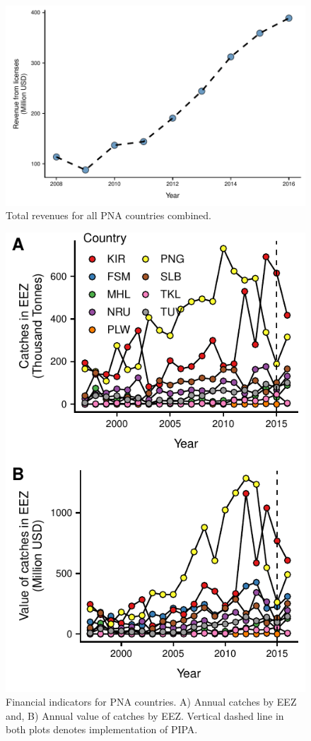 \documentclass[9p,twocolumn,twoside,lineno]{pnas-new}
\begin{document}
\begin{figure}[H]
\centering
	\includegraphics{img/total_PNA_revenues.pdf}
	\caption{\label{fig:total_PNA_revenues}Total revenues for all PNA countries combined.}
\end{figure}

\begin{figure}[H]
\centering
	\includegraphics{img/catches.pdf}
	\caption{\label{fig:catches}Financial indicators for PNA countries. A) Annual catches by EEZ and, B) Annual value of catches by EEZ. Vertical dashed line in both plots denotes implementation of PIPA.}
\end{figure}
\end{document}

